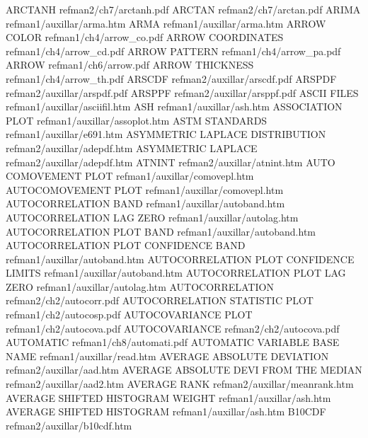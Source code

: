 ARCTANH                                 refman2/ch7/arctanh.pdf
ARCTAN                                  refman2/ch7/arctan.pdf
ARIMA                                   refman1/auxillar/arma.htm
ARMA                                    refman1/auxillar/arma.htm
ARROW COLOR                             refman1/ch4/arrow_co.pdf
ARROW COORDINATES                       refman1/ch4/arrow_cd.pdf
ARROW PATTERN                           refman1/ch4/arrow_pa.pdf
ARROW                                   refman1/ch6/arrow.pdf
ARROW THICKNESS                         refman1/ch4/arrow_th.pdf
ARSCDF                                  refman2/auxillar/arscdf.pdf
ARSPDF                                  refman2/auxillar/arspdf.pdf
ARSPPF                                  refman2/auxillar/arsppf.pdf
ASCII FILES                             refman1/auxillar/asciifil.htm
ASH                                     refman1/auxillar/ash.htm
ASSOCIATION PLOT                        refman1/auxillar/assoplot.htm
ASTM STANDARDS                          refman1/auxillar/e691.htm
ASYMMETRIC LAPLACE DISTRIBUTION         refman2/auxillar/adepdf.htm
ASYMMETRIC LAPLACE                      refman2/auxillar/adepdf.htm
ATNINT                                  refman2/auxillar/atnint.htm
AUTO COMOVEMENT PLOT                    refman1/auxillar/comovepl.htm
AUTOCOMOVEMENT PLOT                     refman1/auxillar/comovepl.htm
AUTOCORRELATION BAND                    refman1/auxillar/autoband.htm
AUTOCORRELATION LAG ZERO                refman1/auxillar/autolag.htm
AUTOCORRELATION PLOT BAND               refman1/auxillar/autoband.htm
AUTOCORRELATION PLOT CONFIDENCE BAND    refman1/auxillar/autoband.htm
AUTOCORRELATION PLOT CONFIDENCE LIMITS  refman1/auxillar/autoband.htm
AUTOCORRELATION PLOT LAG ZERO           refman1/auxillar/autolag.htm
AUTOCORRELATION                         refman2/ch2/autocorr.pdf
AUTOCORRELATION STATISTIC PLOT          refman1/ch2/autocosp.pdf
AUTOCOVARIANCE PLOT                     refman1/ch2/autocova.pdf
AUTOCOVARIANCE                          refman2/ch2/autocova.pdf
AUTOMATIC                               refman1/ch8/automati.pdf
AUTOMATIC VARIABLE BASE NAME            refman1/auxillar/read.htm
AVERAGE ABSOLUTE DEVIATION              refman2/auxillar/aad.htm
AVERAGE ABSOLUTE DEVI FROM THE MEDIAN   refman2/auxillar/aad2.htm
AVERAGE RANK                            refman2/auxillar/meanrank.htm
AVERAGE SHIFTED HISTOGRAM WEIGHT        refman1/auxillar/ash.htm
AVERAGE SHIFTED HISTOGRAM               refman1/auxillar/ash.htm
B10CDF                                  refman2/auxillar/b10cdf.htm
